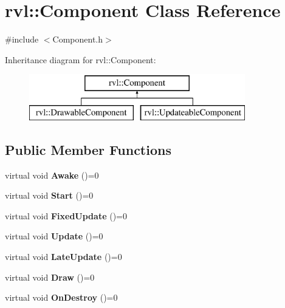 \hypertarget{classrvl_1_1_component}{}\section{rvl\+:\+:Component Class Reference}
\label{classrvl_1_1_component}


{\ttfamily \#include $<$Component.\+h$>$}

Inheritance diagram for rvl\+:\+:Component\+:\begin{figure}[H]
\begin{center}
\leavevmode
\includegraphics[height=2.000000cm]{classrvl_1_1_component}
\end{center}
\end{figure}
\subsection*{Public Member Functions}
\begin{DoxyCompactItemize}
\item 
\mbox{\label{classrvl_1_1_component_a497f250d243d1c7de41c0bf4676903b1}} 
virtual void {\bfseries Awake} ()=0
\item 
\mbox{\label{classrvl_1_1_component_ad3e6a3ef9492973b4df7770cc3cf92d2}} 
virtual void {\bfseries Start} ()=0
\item 
\mbox{\label{classrvl_1_1_component_a6cb8e082f6a907a73eb08a6e91082e7c}} 
virtual void {\bfseries Fixed\+Update} ()=0
\item 
\mbox{\label{classrvl_1_1_component_a592d24437ec964ba1fe40b3a68b58fa5}} 
virtual void {\bfseries Update} ()=0
\item 
\mbox{\label{classrvl_1_1_component_a4a92f1a2c1a8ddd3bcb001a5b452102e}} 
virtual void {\bfseries Late\+Update} ()=0
\item 
\mbox{\label{classrvl_1_1_component_a3f0a916c69b152ee2355b2157764ad11}} 
virtual void {\bfseries Draw} ()=0
\item 
\mbox{\label{classrvl_1_1_component_a85b9c9b9750440caf128b61afb20de4c}} 
virtual void {\bfseries On\+Destroy} ()=0
\end{DoxyCompactItemize}
